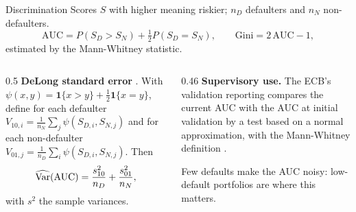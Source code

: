 \documentclass[aspectratio=169,10pt]{beamer}
\begin{document}
\begin{frame}{Discrimination}
  \small
  Scores $S$ with higher meaning riskier; $n_D$ defaulters and $n_N$ non-defaulters.
  \[ \mathrm{AUC} = P(S_D > S_N) + \tfrac12 P(S_D = S_N), \qquad \mathrm{Gini} = 2\,\mathrm{AUC} - 1, \]
  estimated by the Mann-Whitney statistic.
  \begin{columns}[T]
    \begin{column}{0.5\textwidth}
      \textbf{DeLong standard error} \citep{delong1988comparing}. With $\psi(x,y) = \mathbf{1}\{x > y\} + \tfrac12\mathbf{1}\{x = y\}$, define for each defaulter $V_{10,i} = \frac{1}{n_N}\sum_j \psi(S_{D,i}, S_{N,j})$ and for each non-defaulter $V_{01,j} = \frac{1}{n_D}\sum_i \psi(S_{D,i}, S_{N,j})$. Then
      \[ \widehat{\operatorname{Var}}(\mathrm{AUC}) = \frac{s_{10}^2}{n_D} + \frac{s_{01}^2}{n_N}, \]
      with $s^2$ the sample variances.
    \end{column}
    \begin{column}{0.46\textwidth}
      \textbf{Supervisory use.} The ECB's validation reporting compares the current AUC with the AUC at initial validation by a test based on a normal approximation, with the Mann-Whitney definition \citep{ecb2019validation}.
      \vspace{0.3em}

      Few defaults make the AUC noisy: low-default portfolios are where this matters.
    \end{column}
  \end{columns}
\end{frame}
\end{document}
